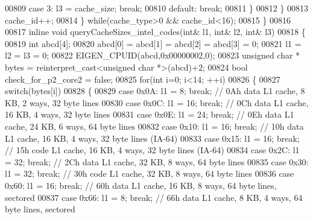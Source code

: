 \begin{DoxyCode}
{00809         \textcolor{keywordflow}{case} 3: l3 = cache\_size; \textcolor{keywordflow}{break};
00810         \textcolor{keywordflow}{default}: \textcolor{keywordflow}{break};
00811       \}
00812     \}
00813     cache\_id++;
00814   \} \textcolor{keywordflow}{while}(cache\_type>0 && cache\_id<16);
00815 \}
00816 
00817 \textcolor{keyword}{inline} \textcolor{keywordtype}{void} queryCacheSizes\_intel\_codes(\textcolor{keywordtype}{int}& l1, \textcolor{keywordtype}{int}& l2, \textcolor{keywordtype}{int}& l3)
00818 \{
00819   \textcolor{keywordtype}{int} abcd[4];
00820   abcd[0] = abcd[1] = abcd[2] = abcd[3] = 0;
00821   l1 = l2 = l3 = 0;
00822   EIGEN\_CPUID(abcd,0x00000002,0);
00823   \textcolor{keywordtype}{unsigned} \textcolor{keywordtype}{char} * bytes = \textcolor{keyword}{reinterpret\_cast<}\textcolor{keywordtype}{unsigned} \textcolor{keywordtype}{char} *\textcolor{keyword}{>}(abcd)+2;
00824   \textcolor{keywordtype}{bool} check\_for\_p2\_core2 = \textcolor{keyword}{false};
00825   \textcolor{keywordflow}{for}(\textcolor{keywordtype}{int} i=0; i<14; ++i)
00826   \{
00827     \textcolor{keywordflow}{switch}(bytes[i])
00828     \{
00829       \textcolor{keywordflow}{case} 0x0A: l1 = 8; \textcolor{keywordflow}{break};   \textcolor{comment}{// 0Ah   data L1 cache, 8 KB, 2 ways, 32 byte lines}
00830       \textcolor{keywordflow}{case} 0x0C: l1 = 16; \textcolor{keywordflow}{break};  \textcolor{comment}{// 0Ch   data L1 cache, 16 KB, 4 ways, 32 byte lines}
00831       \textcolor{keywordflow}{case} 0x0E: l1 = 24; \textcolor{keywordflow}{break};  \textcolor{comment}{// 0Eh   data L1 cache, 24 KB, 6 ways, 64 byte lines}
00832       \textcolor{keywordflow}{case} 0x10: l1 = 16; \textcolor{keywordflow}{break};  \textcolor{comment}{// 10h   data L1 cache, 16 KB, 4 ways, 32 byte lines (IA-64)}
00833       \textcolor{keywordflow}{case} 0x15: l1 = 16; \textcolor{keywordflow}{break};  \textcolor{comment}{// 15h   code L1 cache, 16 KB, 4 ways, 32 byte lines (IA-64)}
00834       \textcolor{keywordflow}{case} 0x2C: l1 = 32; \textcolor{keywordflow}{break};  \textcolor{comment}{// 2Ch   data L1 cache, 32 KB, 8 ways, 64 byte lines}
00835       \textcolor{keywordflow}{case} 0x30: l1 = 32; \textcolor{keywordflow}{break};  \textcolor{comment}{// 30h   code L1 cache, 32 KB, 8 ways, 64 byte lines}
00836       \textcolor{keywordflow}{case} 0x60: l1 = 16; \textcolor{keywordflow}{break};  \textcolor{comment}{// 60h   data L1 cache, 16 KB, 8 ways, 64 byte lines, sectored}
00837       \textcolor{keywordflow}{case} 0x66: l1 = 8; \textcolor{keywordflow}{break};   \textcolor{comment}{// 66h   data L1 cache, 8 KB, 4 ways, 64 byte lines, sectored}
}
\end{DoxyCode}
